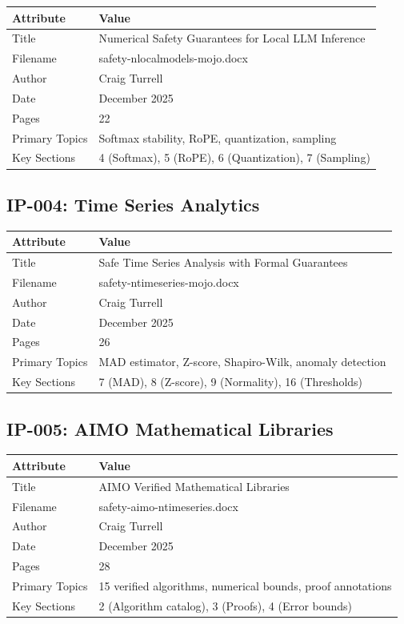 \begin{tabularx}{\textwidth}{@{}lX@{}}
\toprule
\textbf{Attribute} & \textbf{Value} \\
\midrule
Title & Numerical Safety Guarantees for Local LLM Inference \\
Filename & safety-nlocalmodels-mojo.docx \\
Author & Craig Turrell \\
Date & December 2025 \\
Pages & 22 \\
Primary Topics & Softmax stability, RoPE, quantization, sampling \\
Key Sections & 4 (Softmax), 5 (RoPE), 6 (Quantization), 7 (Sampling) \\
\bottomrule
\end{tabularx}

\subsection{IP-004: Time Series Analytics}

\begin{tabularx}{\textwidth}{@{}lX@{}}
\toprule
\textbf{Attribute} & \textbf{Value} \\
\midrule
Title & Safe Time Series Analysis with Formal Guarantees \\
Filename & safety-ntimeseries-mojo.docx \\
Author & Craig Turrell \\
Date & December 2025 \\
Pages & 26 \\
Primary Topics & MAD estimator, Z-score, Shapiro-Wilk, anomaly detection \\
Key Sections & 7 (MAD), 8 (Z-score), 9 (Normality), 16 (Thresholds) \\
\bottomrule
\end{tabularx}

\subsection{IP-005: AIMO Mathematical Libraries}

\begin{tabularx}{\textwidth}{@{}lX@{}}
\toprule
\textbf{Attribute} & \textbf{Value} \\
\midrule
Title & AIMO Verified Mathematical Libraries \\
Filename & safety-aimo-ntimeseries.docx \\
Author & Craig Turrell \\
Date & December 2025 \\
Pages & 28 \\
Primary Topics & 15 verified algorithms, numerical bounds, proof annotations \\
Key Sections & 2 (Algorithm catalog), 3 (Proofs), 4 (Error bounds) \\
\bottomrule
\end{tabularx}


